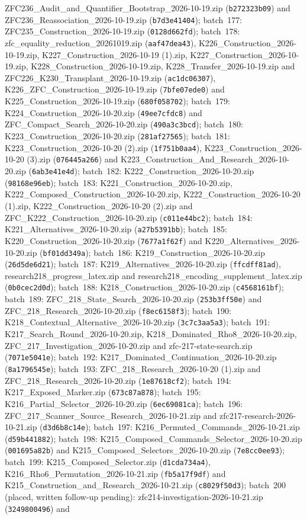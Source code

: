 \documentclass[11pt]{article}
\begin{document}
ZFC236\_Audit\_and\_Quantifier\_Bootstrap\_2026-10-19.zip (\texttt{b272323b09}) and ZFC236\_Reassociation\_2026-10-19.zip (\texttt{b7d3e41404}); batch~177: ZFC235\_Construction\_2026-10-19.zip (\texttt{0128d662fd}); batch~178: zfc\_equality\_reduction\_20261019.zip (\texttt{aaf47dea43}), K226\_Construction\_2026-10-19.zip, K227\_Construction\_2026-10-19 (1).zip, K227\_Construction\_2026-10-19.zip, K228\_Construction\_2026-10-19.zip, K228\_Transfer\_2026-10-19.zip and ZFC226\_K230\_Transplant\_2026-10-19.zip (\texttt{ac1dc06307}), K226\_ZFC\_Construction\_2026-10-19.zip (\texttt{7bfe07ede0}) and K225\_Construction\_2026-10-19.zip (\texttt{680f058702}); batch~179: K224\_Construction\_2026-10-20.zip (\texttt{49ee7cfdc8}) and ZFC\_Compact\_Search\_2026-10-20.zip (\texttt{490a3c3bcd}); batch~180: K223\_Construction\_2026-10-20.zip (\texttt{281af27565}); batch~181: K223\_Construction\_2026-10-20 (2).zip (\texttt{1f751b0aa4}), K223\_Construction\_2026-10-20 (3).zip (\texttt{076445a266}) and K223\_Construction\_And\_Research\_2026-10-20.zip (\texttt{6ab3e41e4d}); batch~182: K222\_Construction\_2026-10-20.zip (\texttt{98168e96eb}); batch~183: K221\_Construction\_2026-10-20.zip, K222\_Composed\_Construction\_2026-10-20.zip, K222\_Construction\_2026-10-20 (1).zip, K222\_Construction\_2026-10-20 (2).zip and ZFC\_K222\_Construction\_2026-10-20.zip (\texttt{c011e44bc2}); batch~184: K221\_Alternatives\_2026-10-20.zip (\texttt{a27b5391bb}); batch~185: K220\_Construction\_2026-10-20.zip (\texttt{7677a1f62f}) and K220\_Alternatives\_2026-10-20.zip (\texttt{bf01dd349a}); batch~186: K219\_Construction\_2026-10-20.zip (\texttt{26d5de6d21}); batch~187: K219\_Alternatives\_2026-10-20.zip (\texttt{ffcdff81ad}), research218\_progress\_latex.zip and research218\_encoding\_supplement\_latex.zip (\texttt{0b0cec2d0d}); batch~188: K218\_Construction\_2026-10-20.zip (\texttt{c4568161bf}); batch~189: ZFC\_218\_State\_Search\_2026-10-20.zip (\texttt{253b3ff50e}) and ZFC\_218\_Research\_2026-10-20.zip (\texttt{f8ec6158f3}); batch~190: K218\_Contextual\_Alternative\_2026-10-20.zip (\texttt{3c7c3aa5a3}); batch~191: K217\_Search\_Round\_2026-10-20.zip, K218\_Dominated\_Rho8\_2026-10-20.zip, ZFC\_217\_Investigation\_2026-10-20.zip and zfc-217-state-search.zip (\texttt{7071e5041e}); batch~192: K217\_Dominated\_Continuation\_2026-10-20.zip (\texttt{8a1796545e}); batch~193: ZFC\_218\_Research\_2026-10-20 (1).zip and ZFC\_218\_Research\_2026-10-20.zip (\texttt{1e87618cf2}); batch~194: K217\_Exposed\_Marker.zip (\texttt{673c87a878}); batch~195: K216\_Partial\_Selector\_2026-10-20.zip (\texttt{6ec69081ca}); batch~196: ZFC\_217\_Scanner\_Source\_Research\_2026-10-21.zip and zfc217-research-2026-10-21.zip (\texttt{d3d6b8c14e}); batch~197: K216\_Permuted\_Commands\_2026-10-21.zip (\texttt{d59b441882}); batch~198: K215\_Composed\_Commands\_Selector\_2026-10-20.zip (\texttt{001695a82b}) and K215\_Composed\_Selectors\_2026-10-20.zip (\texttt{7e8cc0ee93}); batch~199: K215\_Composed\_Selector.zip (\texttt{d1cda734a4}), K216\_Rho6\_Permutation\_2026-10-21.zip (\texttt{fb5a17f9df}) and K215\_Construction\_and\_Research\_2026-10-21.zip (\texttt{c8029f50d3}); batch~200 (placed, written follow-up pending): zfc214-investigation-2026-10-21.zip (\texttt{3249800496}) and 
\end{document}
